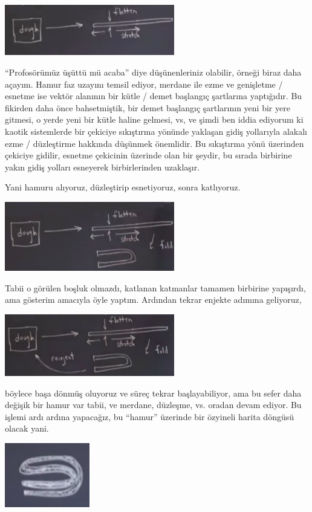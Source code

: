 \documentclass[12pt,fleqn]{article}\usepackage{../../common}
\begin{document}
\includegraphics[width=20em]{23_01.png}

``Profosörümüz üşüttü mü acaba'' diye düşünenleriniz olabilir, örneği biraz daha
açayım. Hamur faz uzayını temsil ediyor, merdane ile ezme ve genişletme /
esnetme ise vektör alanının bir kütle / demet başlangıç şartlarına
yaptığıdır. Bu fikirden daha önce bahsetmiştik, bir demet başlangıç şartlarının
yeni bir yere gitmesi, o yerde yeni bir kütle haline gelmesi, vs, ve şimdi ben
iddia ediyorum ki kaotik sistemlerde bir çekiciye sıkıştırma yönünde yaklaşan
gidiş yollarıyla alakalı ezme / düzleştirme hakkında düşünmek önemlidir. Bu
sıkıştırma yönü üzerinden çekiciye gidilir, esnetme çekicinin üzerinde olan bir
şeydir, bu sırada birbirine yakın gidiş yolları esneyerek birbirlerinden
uzaklaşır.

Yani hamuru alıyoruz, düzleştirip esnetiyoruz, sonra katlıyoruz.

\includegraphics[width=20em]{23_02.png}

Tabii o görülen boşluk olmazdı, katlanan katmanlar tamamen birbirine yapışırdı,
ama gösterim amacıyla öyle yaptım. Ardından tekrar enjekte adımına geliyoruz,

\includegraphics[width=20em]{23_03.png}

böylece başa dönmüş oluyoruz ve süreç tekrar başlayabiliyor, ama bu sefer daha
değişik bir hamur var tabii, ve merdane, düzleşme, vs. oradan devam ediyor. Bu
işlemi ardı ardına yapacağız, bu ``hamur'' üzerinde bir özyineli harita döngüsü
olacak yani.

\includegraphics[width=10em]{23_05.png}
\end{document}
